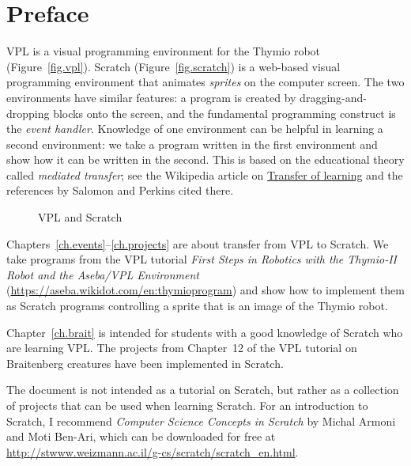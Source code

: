 \chapter*{Preface}


VPL is a visual programming environment for the Thymio robot
(Figure~\ref{fig.vpl}). Scratch (Figure~\ref{fig.scratch}) is a
web-based visual programming environment that animates \emph{sprites} on
the computer screen. The two environments have similar features: a
program is created by dragging-and-dropping blocks onto the screen, and
the fundamental programming construct is the \emph{event handler}.
Knowledge of one environment can be helpful in learning a second
environment: we take a program written in the first environment and show
how it can be written in the second. This is based on the educational
theory called \emph{mediated transfer}; see the Wikipedia article on
\href{https://en.wikipedia.org/wiki/Transfer_of_learning}{Transfer of
learning} and the references by Salomon and Perkins cited there.

\begin{figure}[hb]
\centering
	\hspace{1.5cm}
    \caption{VPL and Scratch}
    \label{fig.vplscratch}
\end{figure}

Chapters~\ref{ch.events}--\ref{ch.projects} are about transfer from VPL
to Scratch. We take programs from the VPL tutorial \emph{First Steps in
Robotics with the Thymio-II Robot and the Aseba/VPL Environment}
(\url{https://aseba.wikidot.com/en:thymioprogram}) and show how to
implement them as Scratch programs controlling a sprite that is an image
of the Thymio robot.

Chapter~\ref{ch.brait} is intended for students with a good knowledge of
Scratch who are learning VPL. The projects from Chapter~12 of the VPL
tutorial on Braitenberg creatures have been implemented in Scratch.


The document is not intended as a tutorial on Scratch, but
rather as a collection of projects that can be used when learning
Scratch. For an introduction to Scratch, I recommend \textit{Computer
Science Concepts in Scratch} by Michal Armoni and Moti Ben-Ari, which
can be downloaded for free at
\url{http://stwww.weizmann.ac.il/g-cs/scratch/scratch_en.html}.

